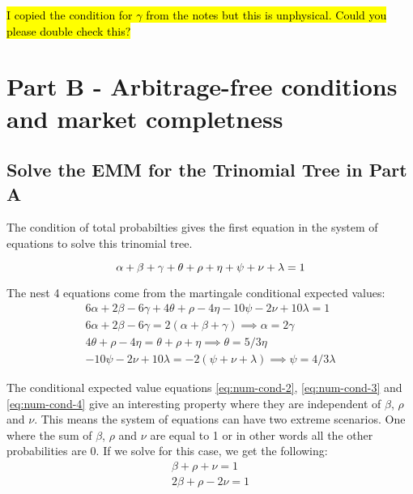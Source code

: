 \documentclass{article}
\begin{document}
\hl{I copied the condition for $\gamma$ from the notes but this is unphysical. Could you please double check this? }

\section{Part B - Arbitrage-free conditions and market completness}

\subsection{Solve the EMM for the Trinomial Tree in Part A}

The condition of total probabilties gives the first equation in the system of equations to solve this trinomial tree.

\begin{equation}
    \alpha + \beta + \gamma + \theta + \rho + \eta + \psi + \nu + \lambda = 1 \label{eq:total-prob} \\
\end{equation}

The nest 4 equations come from the martingale conditional expected values:
\begin{align}
    6\alpha + 2\beta - 6\gamma + 4\theta + \rho - 4\eta - 10\psi - 2\nu + 10\lambda = 1 \label{eq:num-cond-1} \\
    6\alpha + 2\beta - 6\gamma = 2(\alpha + \beta + \gamma) \implies \alpha = 2\gamma \label{eq:num-cond-2} \\
    4\theta + \rho - 4\eta = \theta + \rho + \eta \implies \theta = 5/3\eta \label{eq:num-cond-3} \\
    - 10\psi - 2\nu + 10\lambda = - 2(\psi + \nu + \lambda) \implies \psi = 4/3 \lambda \label{eq:num-cond-4}
\end{align}

The conditional expected value equations \ref{eq:num-cond-2}, \ref{eq:num-cond-3} and \ref{eq:num-cond-4} give an interesting property where they are independent of $\beta$, $\rho$ and $\nu$. This means the system of equations can have two extreme scenarios. One where the sum of $\beta$, $\rho$ and $\nu$ are equal to 1 or in other words all the other probabilities are 0. If we solve for this case, we get the following:
\begin{align}
    \beta + \rho + \nu = 1 \label{eq:total-prob-sub-1} \\
    2\beta  + \rho - 2\nu = 1 \label{eq:num-cond-1-sub-1}
\end{align}
\end{document}
